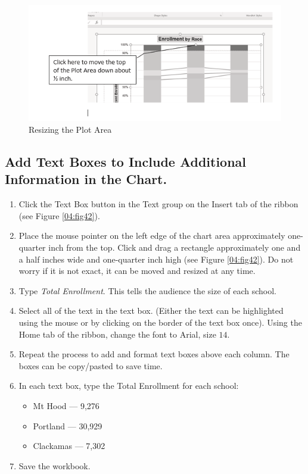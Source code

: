 \begin{figure}[H]
	\centering
	\includegraphics[width=\maxwidth{.95\linewidth}]{gfx/ch04_fig41}
	\caption{Resizing the Plot Area}
	\label{04:fig41}
\end{figure}

\subsection{Add Text Boxes to Include Additional Information in the Chart.}

\begin{enumerate}
	\item Click the Text Box button in the Text group on the Insert tab of the ribbon (see Figure \ref{04:fig42}). 
\item Place the mouse pointer on the left edge of the chart area approximately one-quarter inch from the top. Click and drag a rectangle approximately one and a half inches wide and one-quarter inch high (see Figure \ref{04:fig42}). Do not worry if it is not exact, it can be moved and resized at any time.
\item Type \textit{Total Enrollment}. This tells the audience the size of each school.
\item Select all of the text in the text box. (Either the text can be highlighted using the mouse or by clicking on the border of the text box once). Using the Home tab of the ribbon, change the font to Arial, size $ 14 $.
\item Repeat the process to add and format text boxes above each column. The boxes can be copy/pasted to save time.
\item In each text box, type the Total Enrollment for each school:

	\begin{itemize}
		\item Mt Hood --- 9,276
		\item Portland --- 30,929
		\item Clackamas --- 7,302
	\end{itemize}

\item Save the workbook.

\end{enumerate}


